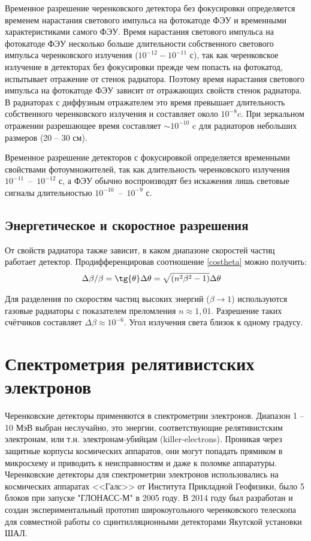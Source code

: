 \begin{Diplom-Main}
	Временное разрешение черенковского детектора без фокусировки определяется временем нарастания светового импульса на фотокатоде ФЭУ и временными характеристиками самого ФЭУ. Время нарастания светового импульса на фотокатоде ФЭУ несколько больше длительности собственного светового импульса черенковского излучения ($10^{-12} - 10^{-11}$ с), так как черенковское излучение в детекторах без фокусировки прежде чем попасть на фотокатод, испытывает отражение от стенок радиатора. Поэтому время нарастания светового импульса на фотокатоде ФЭУ зависит от отражающих свойств стенок радиатора. В радиаторах с диффузным отражателем это время превышает длительность собственного черенковского излучения и составляет около $10^{-8} c$. При зеркальном отражении разрешающее время составляет $\sim 10^{-10}$ c для радиаторов небольших размеров (20 -- 30 см).
	
	Временное разрешение детекторов с фокусировкой определяется временными свойствами фотоумножителей, так как длительность черенковского излучения $10^{-11}$~--~$10^{-12}$ с, а ФЭУ обычно воспроизводят без искажения лишь световые сигналы длительностью $10^{-10}$~--~$10^{-9}$ с.
	\subsection{Энергетическое и скоростное разрешения}
	\label{sec:subsection}
	От свойств радиатора также зависит, в каком диапазоне скоростей частиц работает детектор. Продифференцировав соотношение \ref{costheta} можно получить:
	\begin{align}
	&		\Delta\beta / \beta = \tg{\theta}\Delta\theta = \sqrt{(n^2\beta^2 - 1)}\Delta\theta
	\label{velocity}
	\end{align}
	
	 Для разделения по скоростям частиц высоких энергий ($ \beta \rightarrow 1 $) используются газовые радиаторы с показателем преломления $ n \approx 1,01 $. Разрешение таких счётчиков составляет $\Delta\beta \approx 10^{-6}$. Угол излучения света близок к одному градусу.
	 
	 \section{Спектрометрия релятивистских электронов}
	 Черенковские детекторы применяются в спектрометрии электронов. Диапазон 1 -- 10 МэВ выбран неслучайно, это энергии, соответствующие релятивистским электронам, или т.н. электронам-убийцам (killer-electrons). 
	 Проникая через защитные корпусы космических аппаратов, они могут попадать прямиком в микросхему и приводить к неисправностям и даже к поломке аппаратуры. 
	 Черенковские детекторы для спектрометрии электронов использовались на космических аппаратах <<Галс>> от Института Прикладной Геофизики, было 5 блоков при запуске "ГЛОНАСС-М" в 2005 году.
	 В 2014 году был разработан и создан экспериментальный прототип широкоугольного черенковского телескопа для совместной работы со сцинтилляционными детекторами Якутской установки ШАЛ.
	 
	
\end{Diplom-Main}